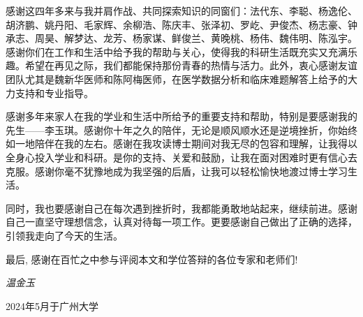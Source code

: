 \begin{thanks}
感谢这四年多来与我并肩作战、共同探索知识的同窗们：法代东、李聪、杨逸伦、胡济鹏、姚丹阳、毛家辉、余柳浩、陈庆丰、张泽初、罗屹、尹俊杰、杨志豪、钟承志、周昊、解梦达、龙芳、杨家谋、鲜俊兰、黄晚桃、杨伟、魏伟明、陈泓宇。感谢你们在工作和生活中给予我的帮助与关心，使得我的科研生活既充实又充满乐趣。希望在再见之际，我们都能保持那份青春的热情与活力。此外，衷心感谢友谊团队尤其是魏新华医师和陈阿梅医师，在医学数据分析和临床难题解答上给予的大力支持和专业指导。

感谢多年来家人在我的学业和生活中所给予的重要支持和帮助，特别是要感谢我的先生------李玉琪。感谢你十年之久的陪伴，无论是顺风顺水还是逆境挫折，你始终如一地陪伴在我的左右。感谢在我攻读博士期间对我无尽的包容和理解，让我得以全身心投入学业和科研。是你的支持、关爱和鼓励，让我在面对困难时更有信心去克服。感谢你毫不犹豫地成为我坚强的后盾，让我可以轻松愉快地渡过博士学习生活。

同时，我也要感谢自己在每次遇到挫折时，我都能勇敢地站起来，继续前进。感谢自己一直坚守理想信念，认真对待每一项工作。更要感谢自己做出了正确的选择，引领我走向了今天的生活。


最后, 感谢在百忙之中参与评阅本文和学位答辩的各位专家和老师们! 




\vskip 26pt
\hspace{10.5cm} \textit{温金玉}

\vskip 6pt
\hspace{9.0cm} 2024年5月于广州大学 
\end{thanks}
